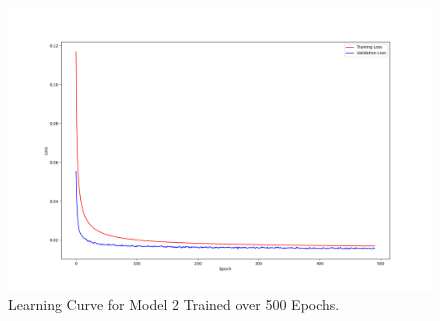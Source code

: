 \documentclass[12pt]{article}
\begin{document}
\begin{figure}[hp]
    \includegraphics[scale=0.35, center]{figures/learning_curve_2.png}
    \caption{Learning Curve for Model 2 Trained over 500 Epochs.}
    \label{fig:learning_curve_2}
\end{figure}
\end{document}
